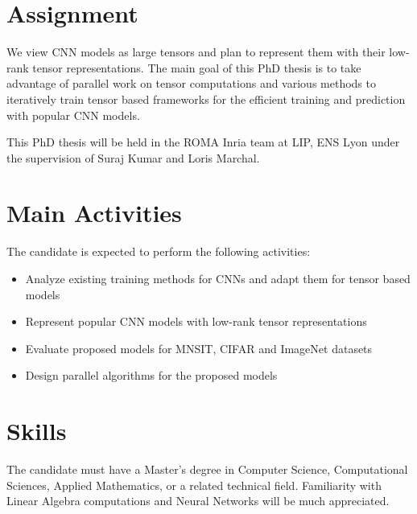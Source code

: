 \documentclass[a4paper]{article}
\begin{document}
\section*{Assignment}


We view CNN models as large tensors and plan to represent them with their low-rank tensor representations. The main goal of this PhD thesis is to take advantage of parallel work on tensor computations and various methods to iteratively train tensor based frameworks for the efficient training and prediction with popular CNN models.


This PhD thesis will be held in the ROMA Inria team at LIP, ENS Lyon under the supervision of Suraj Kumar and Loris Marchal.

\section*{Main Activities}

The candidate is expected to perform the following activities:
\begin{itemize}
	\item Analyze existing training methods for CNNs and adapt them for tensor based models
	\item Represent popular CNN models with low-rank tensor representations
	\item Evaluate proposed models for MNSIT, CIFAR and ImageNet datasets
	\item Design parallel algorithms for the proposed models
\end{itemize}

\section*{Skills}

The candidate must have a Master's degree  in Computer Science, Computational Sciences, Applied Mathematics, or a related technical field.\newline
Familiarity with Linear Algebra computations and Neural Networks will be much appreciated. 





\footnotesize 
\end{document}
